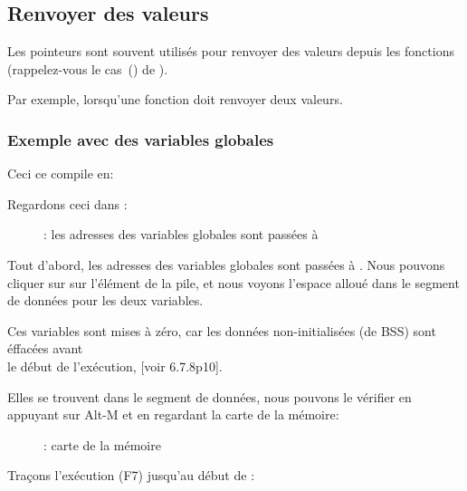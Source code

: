 \subsection{Renvoyer des valeurs}

Les pointeurs sont souvent utilisés pour renvoyer des valeurs depuis les fonctions
(rappelez-vous le cas~() de \scanf).

Par exemple, lorsqu'une fonction doit renvoyer deux valeurs.

\subsubsection{Exemple avec des variables globales}



Ceci ce compile en:



\myindex{\olly}
\clearpage
Regardons ceci dans \olly:

\begin{figure}[H]
\centering
{}
\caption{\olly: 
les adresses des variables globales sont passées à \ttfone}
\label{fig:pointers_olly_global_1}
\end{figure}

Tout d'abord, les adresses des variables globales sont passées à \ttfone.
Nous pouvons cliquer sur 
sur l'élément de la pile, et nous voyons l'espace alloué dans le segment de données
pour les deux variables.

\clearpage
Ces variables sont mises à zéro, car les données non-initialisées (de
\ac{BSS}) sont éffacées avant\\
le début de l'exécution, [voir \CNineNineStd{} 6.7.8p10].

Elles se trouvent dans le segment de données, nous pouvons le vérifier en appuyant
sur Alt-M et en regardant la carte de la mémoire:

\begin{figure}[H]
\centering
{}
\caption{\olly: carte de la mémoire}
\label{fig:pointers_olly_global_5}
\end{figure}

\clearpage
Traçons l'exécution (F7) jusqu'au début de \ttfone:


